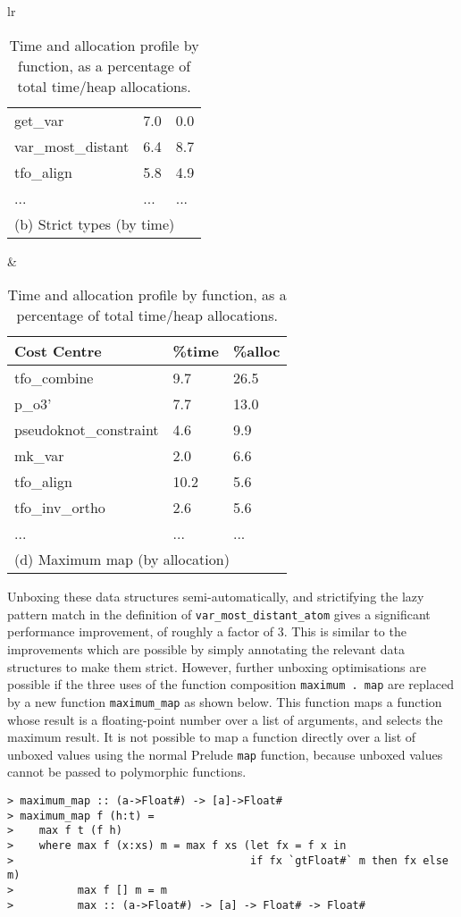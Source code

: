 \begin{table}
\begin{center}
\begin{tabular}{lr}
\begin{tabular}{|l|l|l|}
get\_var          &    7.0      &    0.0 \\
var\_most\_distant&    6.4      &    8.7 \\
tfo\_align        &    5.8      &    4.9 \\
...               &      ...    & ... \\
\hline
\multicolumn{3}{l}{(b) Strict types (by time)}
\end{tabular}
&
\begin{tabular}{|l|l|l|}
\hline
{\bf Cost Centre} &  \%time     & \%alloc \\
\hline
tfo\_combine      &    9.7      &   26.5 \\
p\_o3'            &    7.7      &   13.0 \\
pseudoknot\_constraint &    4.6 &    9.9 \\
mk\_var           &    2.0      &    6.6 \\
tfo\_align        &   10.2      &    5.6 \\
tfo\_inv\_ortho   &    2.6      &    5.6 \\
...               &      ...    & ... \\
\hline
\multicolumn{3}{l}{(d) Maximum map (by allocation)}
\end{tabular}
\end{tabular}
\end{center}
\caption{Time and allocation profile by function, as a percentage of
total time/heap allocations.}
\label{tbl:glasgow-profile}
\end{table}

Unboxing these data structures semi-automatically, and strictifying the
lazy pattern match in the definition of \verb=var_most_distant_atom=
gives a significant performance improvement, of roughly a factor of 3.
This is similar to the improvements which are possible by simply
annotating the relevant data structures to make them strict. However,
further unboxing optimisations are possible if the three uses of the function composition
\verb=maximum . map= are replaced by a new function \verb=maximum_map=
as shown below. This function maps a function whose result is a
floating-point number over a list of arguments, and selects the maximum
result. It is not possible to map a function directly over a list of
unboxed values using the normal Prelude \verb=map= function, because
unboxed values cannot be passed to polymorphic functions.
\begin{verbatim}
> maximum_map :: (a->Float#) -> [a]->Float#
> maximum_map f (h:t) =
>    max f t (f h)
>    where max f (x:xs) m = max f xs (let fx = f x in
>                                     if fx `gtFloat#` m then fx else m)
>          max f [] m = m
>          max :: (a->Float#) -> [a] -> Float# -> Float#
\end{verbatim}

